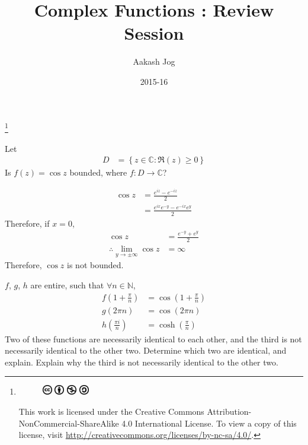\documentclass[titlepage, fleqn, a4paper, 12pt, twoside]{article}
\title{Complex Functions : Review Session}
\author{Aakash Jog}
\date{2015-16}
\theoremstyle{definition}
\theoremstyle{theorem}
\newcommand\blfootnote[1]{%
	\begingroup
	\renewcommand\thefootnote{}\footnote{#1}%
	\addtocounter{footnote}{-1}%
	\endgroup
}
\begin{document}
\maketitle

\blfootnote
{	
	\begin{figure}[H]
		\includegraphics[height = 12pt]{cc.eps}
		\includegraphics[height = 12pt]{by.eps}
		\includegraphics[height = 12pt]{nc.eps}
		\includegraphics[height = 12pt]{sa.eps}
	\end{figure}
	This work is licensed under the Creative Commons Attribution-NonCommercial-ShareAlike 4.0 International License. To view a copy of this license, visit \url{http://creativecommons.org/licenses/by-nc-sa/4.0/}.
} %

\begin{question}{10}
	Let
	\begin{align*}
		D & = \left\{ z \in \mathbb{C} : \Re(z) \ge 0 \right\}
	\end{align*}
	Is $f(z) = \cos z$ bounded, where $f : D \to \mathbb{C}$?
\end{question}

\begin{solution}
	\begin{align*}
		\cos z & = \frac{e^{i z} - e^{-i z}}{2} \\
                       & = \frac{e^{i x} e^{-y} - e^{-i x} e^y}{2}
	\end{align*}
	Therefore, if $x = 0$,
	\begin{align*}
		\cos z                                           & = \frac{e^{-y} + e^y}{2} \\
		\therefore \lim\limits_{y \to \pm \infty} \cos z & = \infty
	\end{align*}
	Therefore, $\cos z$ is not bounded.
\end{solution}

\begin{question}{15}
	$f$, $g$, $h$ are entire, such that $\forall n \in \mathbb{N}$,
	\begin{align*}
		f\left( 1 + \frac{\pi}{n} \right) & = \cos\left( 1 + \frac{\pi}{n} \right) \\
		g(2 \pi n)                        & = \cos(2 \pi n)                        \\
		h\left( \frac{\pi i}{n} \right)   & = \cosh\left( \frac{\pi}{n} \right)
	\end{align*}
	Two of these functions are necessarily identical to each other, and the third is not necessarily identical to the other two.
	Determine which two are identical, and explain.
	Explain why the third is not necessarily identical to the other two.
\end{question}
\end{document}
